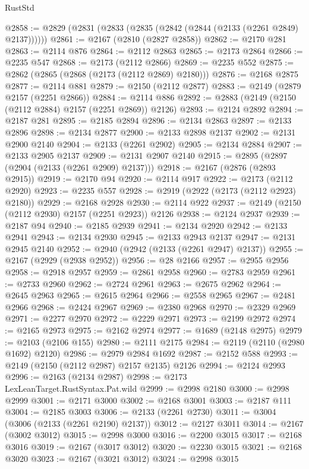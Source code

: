 \begin{lexlean}{RustStd}
\begin{coremodule}
@2858 := @2829 (@2831 (@2833 (@2835 (@2842 (@2844 (@2133 (@2261 @2849) @2137))))))
@2861 := @2167 (@2810 (@2827 @2858))
@2862 := @2170 @281
@2863 := @2114 @876
@2864 := @2112 @2863
@2865 := @2173 @2864
@2866 := @2235 @547
@2868 := @2173 (@2112 @2866)
@2869 := @2235 @552
@2875 := @2862 (@2865 (@2868 (@2173 (@2112 @2869) @2180)))
@2876 := @2168 @2875
@2877 := @2114 @881
@2879 := @2150 (@2112 @2877)
@2883 := @2149 (@2879 @2157 (@2251 @2866))
@2884 := @2114 @886
@2892 := @2883 (@2149 (@2150 (@2112 @2884) @2157 (@2251 @2869)) @2126)
@2893 := @2124 @2892
@2894 := @2187 @281
@2895 := @2185 @2894
@2896 := @2134 @2863
@2897 := @2133 @2896
@2898 := @2134 @2877
@2900 := @2133 @2898 @2137
@2902 := @2131 @2900 @2140
@2904 := @2133 (@2261 @2902)
@2905 := @2134 @2884
@2907 := @2133 @2905 @2137
@2909 := @2131 @2907 @2140
@2915 := @2895 (@2897 (@2904 (@2133 (@2261 @2909) @2137)))
@2918 := @2167 (@2876 (@2893 @2915))
@2919 := @2170 @94
@2920 := @2114 @917
@2922 := @2173 (@2112 @2920)
@2923 := @2235 @557
@2928 := @2919 (@2922 (@2173 (@2112 @2923) @2180))
@2929 := @2168 @2928
@2930 := @2114 @922
@2937 := @2149 (@2150 (@2112 @2930) @2157 (@2251 @2923)) @2126
@2938 := @2124 @2937
@2939 := @2187 @94
@2940 := @2185 @2939
@2941 := @2134 @2920
@2942 := @2133 @2941
@2943 := @2134 @2930
@2945 := @2133 @2943 @2137
@2947 := @2131 @2945 @2140
@2952 := @2940 (@2942 (@2133 (@2261 @2947) @2137))
@2955 := @2167 (@2929 (@2938 @2952))
@2956 := @28 @2166
@2957 := @2955 @2956
@2958 := @2918 @2957
@2959 := @2861 @2958
@2960 := @2783 @2959
@2961 := @2733 @2960
@2962 := @2724 @2961
@2963 := @2675 @2962
@2964 := @2645 @2963
@2965 := @2615 @2964
@2966 := @2558 @2965
@2967 := @2481 @2966
@2968 := @2424 @2967
@2969 := @2380 @2968
@2970 := @2329 @2969
@2971 := @2277 @2970
@2972 := @2229 @2971
@2973 := @2199 @2972
@2974 := @2165 @2973
@2975 := @2162 @2974
@2977 := @1689 (@2148 @2975)
@2979 := @2103 (@2106 @155)
@2980 := @2111 @2175
@2984 := @2119 (@2110 (@2980 @1692) @2120)
@2986 := @2979 @2984 @1692
@2987 := @2152 @588
@2993 := @2149 (@2150 (@2112 @2987) @2157 @2135) @2126
@2994 := @2124 @2993
@2996 := @2163 (@2134 @2987)
@2998 := @2173 LexLeanTarget.RustSyntax.Pat.wild
@2999 := @2998 @2180
@3000 := @2998 @2999
@3001 := @2171 @3000
@3002 := @2168 @3001
@3003 := @2187 @111
@3004 := @2185 @3003
@3006 := @2133 (@2261 @2730)
@3011 := @3004 (@3006 (@2133 (@2261 @2190) @2137))
@3012 := @2127 @3011
@3014 := @2167 (@3002 @3012)
@3015 := @2998 @3000
@3016 := @2200 @3015
@3017 := @2168 @3016
@3019 := @2167 (@3017 @3012)
@3020 := @2230 @3015
@3021 := @2168 @3020
@3023 := @2167 (@3021 @3012)
@3024 := @2998 @3015

\end{coremodule}
\end{lexlean}
